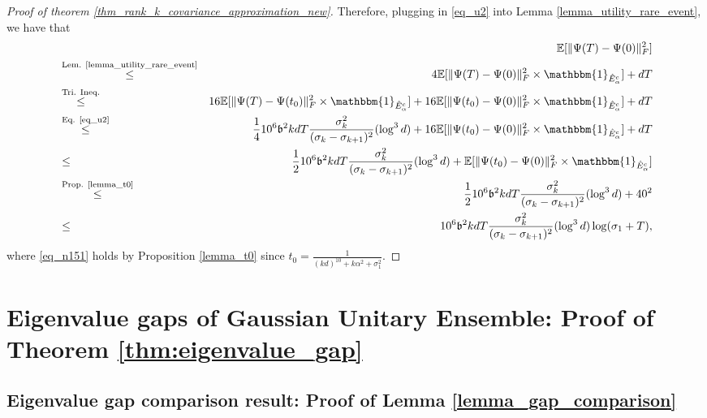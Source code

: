 \documentclass[11pt,letterpaper]{article}
\begin{document}
\begin{proof}[Proof of theorem \ref{thm_rank_k_covariance_approximation_new}]
    Therefore, plugging in \eqref{eq_u2} into Lemma \ref{lemma_utility_rare_event}, we have that
 \begin{eqnarray}
    & & \!\!\!\!\!\!\!\! \! \! \! \! \!\!\!\!\!\!\!\!\!\!\!\!\!\!\!\! \! \! \! \! \!\!\!\!\!\!\!\!\!\!\!\!\!\!\!\! \! \! \mathbb{E}[\|\Psi(T) -  \Psi(0)\|_F^2] \nonumber\\
    &\stackrel{\textrm{Lem. \ref{lemma_utility_rare_event}}}{\leq} & 4\mathbb{E}[\|\Psi(T) - \Psi(0)\|_F^2 \times \mathbbm{1}_{\hat{E}_\alpha^c}] +dT \nonumber\\   
    &\stackrel{\textrm{Tri. Ineq.}}{\leq} & 16\mathbb{E}[\|\Psi(T) - \Psi(t_0)\|_F^2 \times \mathbbm{1}_{\hat{E}_\alpha^c}] +  16\mathbb{E}[\|\Psi(t_0) - \Psi(0)\|_F^2 \times \mathbbm{1}_{\hat{E}_\alpha^c}] + dT  \nonumber\\   
    &\stackrel{\textrm{Eq. \eqref{eq_u2}}}{\leq} & \frac{1}{4} 10^6 \mathfrak{b}^2  kd T  \frac{\sigma_k^2}{(\sigma_k-\sigma_{k+1})^2} (\log^3 d) + 16\mathbb{E}[\|\Psi(t_0) - \Psi(0)\|_F^2 \times \mathbbm{1}_{\hat{E}_\alpha^c}]  +dT \nonumber\\
    &\leq & \frac{1}{2} 10^6 \mathfrak{b}^2  kd T  \frac{\sigma_k^2}{(\sigma_k-\sigma_{k+1})^2} (\log^3 d) + \mathbb{E}[\|\Psi(t_0) - \Psi(0)\|_F^2 \times \mathbbm{1}_{\hat{E}_\alpha^c}] \nonumber\\
       &\stackrel{\textrm{Prop. \ref{lemma_t0}}}{\leq} & \frac{1}{2}  10^6 \mathfrak{b}^2  kd T  \frac{\sigma_k^2}{(\sigma_k-\sigma_{k+1})^2} (\log^3 d) + 40^2 \label{eq_n151}\\
       &\leq & 10^6 \mathfrak{b}^2  kd T  \frac{\sigma_k^2}{(\sigma_k-\sigma_{k+1})^2} (\log^3 d) \log(\sigma_1 + T),  \label{eq_u3}
\end{eqnarray}
%
where \eqref{eq_n151} holds by Proposition \ref{lemma_t0} since $t_0 = \frac{1}{(kd)^{10} + k\alpha^2 +\sigma_1^2}$.
\end{proof}
%

\section{Eigenvalue gaps of Gaussian Unitary Ensemble: Proof of Theorem \ref{thm:eigenvalue_gap}}\label{section_GUE_proof}


\subsection{Eigenvalue gap comparison result: Proof of Lemma \ref{lemma_gap_comparison}} \label{sec_gap_comparison_proof}
\end{document}
